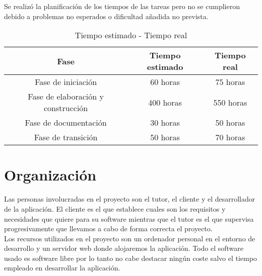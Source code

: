 Se realizó la planificación de los tiempos de las tareas pero no se cumplieron debido a problemas no esperados o dificultad añadida no prevista.

\begin{table}[ht]
\centering  %
\begin{tabular}{c c c} %
\hline\hline                        %
Fase & Tiempo estimado & Tiempo real \\ [0.5ex] %
\hline                  %
Fase de iniciación & 60 horas & 75 horas  \\ %
Fase de elaboración y construcción & 400 horas & 550 horas \\
Fase de documentación & 30 horas &  50 horas\\
Fase de transición & 50 horas & 70 horas  \\ [1ex]      %
\hline %
\end{tabular}
\caption{Tiempo estimado - Tiempo real} %
\end{table}

\section{Organización}
Las personas involucradas en el proyecto son el tutor, el cliente y el desarrollador de la aplicación. El cliente es el que establece cuales son los requisitos y necesidades que quiere para su software mientras que el tutor es el que supervisa progresivamente que llevamos a cabo de forma correcta el proyecto.\\
Los recursos utilizados en el proyecto son un ordenador personal en el entorno de desarrollo y un servidor web donde alojaremos la aplicación. Todo el software usado es software libre por lo tanto no cabe destacar ningún coste salvo el tiempo empleado en desarrollar la aplicación.

